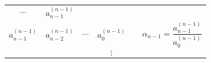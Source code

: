 \documentclass[11pt]{article}
\begin{document}
\begin{longtable}[]{@{}llllll@{}}
\begin{minipage}[t]{0.05\columnwidth}
\[ \dots \]\strut
\end{minipage} & \begin{minipage}[t]{0.05\columnwidth}\raggedright\strut
\[ a_{n-1}^{(n-1)} \]\strut
\end{minipage} & \begin{minipage}[t]{0.05\columnwidth}\raggedright\strut
\strut
\end{minipage} & \begin{minipage}[t]{0.05\columnwidth}\raggedright\strut
\strut
\end{minipage}\tabularnewline
\begin{minipage}[t]{0.05\columnwidth}\raggedright\strut
\[ a_{n-1}^{(n-1)} \]\strut
\end{minipage} & \begin{minipage}[t]{0.05\columnwidth}\raggedright\strut
\[ a_{n-2}^{(n-1)} \]\strut
\end{minipage} & \begin{minipage}[t]{0.05\columnwidth}\raggedright\strut
\[ \dots \]\strut
\end{minipage} & \begin{minipage}[t]{0.05\columnwidth}\raggedright\strut
\[ a_0^{(n-1)} \]\strut
\end{minipage} & \begin{minipage}[t]{0.05\columnwidth}\raggedright\strut
\strut
\end{minipage} & \begin{minipage}[t]{0.05\columnwidth}\raggedright\strut
\[ \alpha_{n-1} = \frac{a_{n-1}^{(n-1)}}{a_0^{(n-1)}} \]\strut
\end{minipage}\tabularnewline
\begin{minipage}[t]{0.05\columnwidth}\raggedright\strut
\strut
\end{minipage} & \begin{minipage}[t]{0.05\columnwidth}\raggedright\strut
\strut
\end{minipage} & \begin{minipage}[t]{0.05\columnwidth}\raggedright\strut
\strut
\end{minipage} & \begin{minipage}[t]{0.05\columnwidth}\raggedright\strut
\[ \vdots \]\strut
\end{minipage} & \begin{minipage}[t]{0.05\columnwidth}\raggedright\strut
\strut
\end{minipage} & \begin{minipage}[t]{0.05\columnwidth}\raggedright\strut
\strut

\end{minipage}
\end{longtable}
\end{document}
